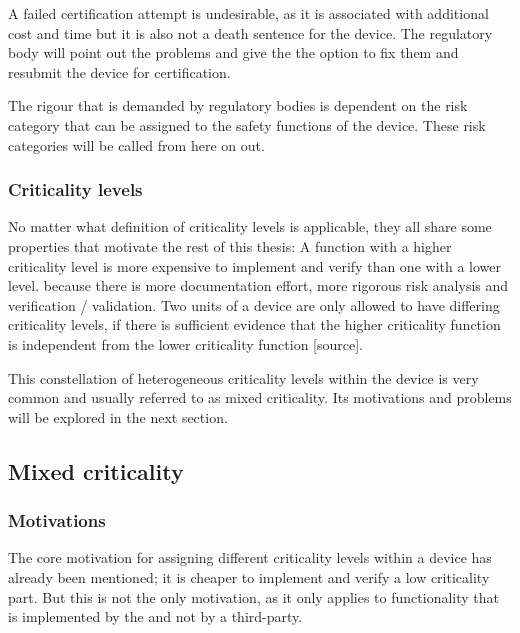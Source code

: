 A failed certification attempt is undesirable, as it is associated with additional cost and time but it is also not a death sentence for the device. The regulatory body will point out the problems and give the \mfg{} the option to fix them and resubmit the device for certification.

The rigour that is demanded by regulatory bodies is dependent on the risk category that can be assigned to the safety functions of the device. These risk categories will be called  from here on out. 

\subsubsection{Criticality levels}

No matter what definition of criticality levels is applicable, they all share some properties that motivate the rest of this thesis: A function with a higher criticality level is more expensive to implement and verify than one with a lower level. because there is more documentation effort, more rigorous risk analysis and verification / validation. Two units of a device are only allowed to have differing criticality levels, if there is sufficient evidence that the higher criticality function is independent from the lower criticality function [source].  %

This constellation of heterogeneous criticality levels within the device is very common and usually referred to as mixed criticality. Its motivations and problems will be explored in the next section.
\subsection{Mixed criticality} \label{mixed-criticality}
\subsubsection{Motivations}
The core motivation for assigning different criticality levels within a device has already been mentioned; it is cheaper to implement and verify a low criticality part. But this is not the only motivation, as it only applies to functionality that is implemented by the \mfg{} and not by a third-party.

